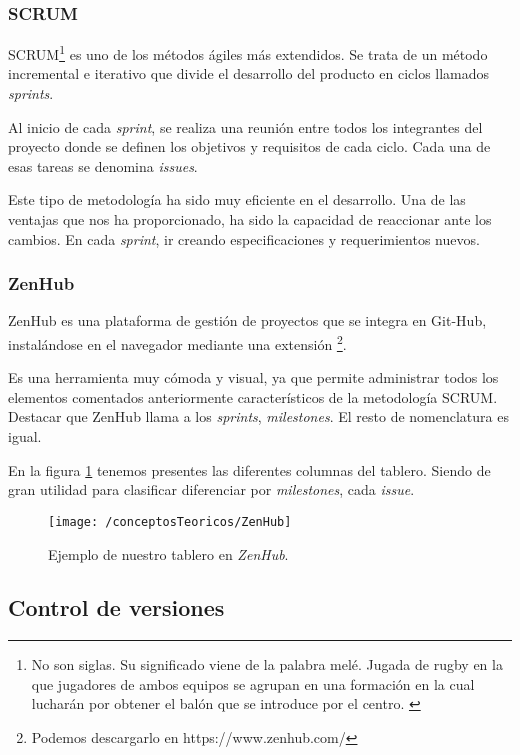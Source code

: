 \subsubsection{SCRUM}

SCRUM\footnote{No son siglas. Su significado viene de la palabra melé. Jugada de rugby en la que 
	jugadores de ambos equipos se agrupan en una formación en la cual lucharán por obtener el balón que se introduce por el centro. \cite{web:scrum_origen}} es uno de los métodos ágiles más extendidos. Se trata de un método incremental e iterativo que divide el desarrollo del producto en ciclos llamados \textit{sprints}.

Al inicio de cada \textit{sprint}, se realiza una reunión entre todos los integrantes del proyecto donde se definen los objetivos y requisitos de cada ciclo. Cada una de esas tareas se denomina \textit{issues}.

Este tipo de metodología ha sido muy eficiente en el desarrollo. Una de las ventajas que nos ha proporcionado, ha sido la capacidad de reaccionar ante los cambios. En cada \textit{sprint}, ir creando especificaciones y requerimientos nuevos.

\subsubsection{ZenHub}

ZenHub es una plataforma de gestión de proyectos que se integra en Git-Hub, instalándose en el navegador mediante una extensión \footnote{Podemos descargarlo en https://www.zenhub.com/}.

Es una herramienta muy cómoda y visual, ya que permite administrar todos los elementos comentados anteriormente característicos de la metodología SCRUM. Destacar que ZenHub llama a los \textit{sprints}, \textit{milestones}. El resto de nomenclatura es igual.

En la figura \ref{fig:ZenHub} tenemos presentes las diferentes columnas del tablero. Siendo de gran utilidad para clasificar diferenciar por \textit{milestones}, cada \textit{issue}.

\begin{figure}[ht]
	\centering
	\texttt{[image: /conceptosTeoricos/ZenHub]}
	\caption{Ejemplo de nuestro tablero en \textit{ZenHub}.}
	\label{fig:ZenHub}
\end{figure}

\subsection{Control de versiones}

